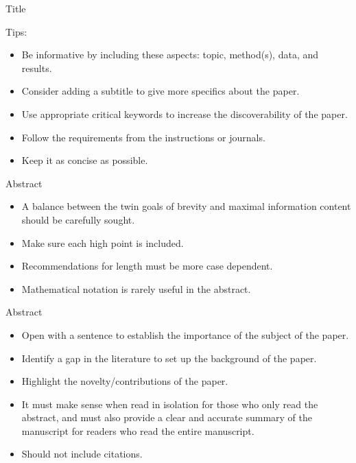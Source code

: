 \documentclass{beamer}
\begin{document}
    
    \begin{frame}{Title}
    
    Tips:
    \begin{itemize}
        \item Be informative by including these aspects: topic, method(s), data, and results.
        \item Consider adding a subtitle to give more specifics about the paper.
        \item Use appropriate critical keywords to increase the discoverability of the paper.
        \item Follow the requirements from the instructions or journals.
        \item Keep it as concise as possible.
    \end{itemize}
    
    \end{frame}
    
    
    \begin{frame}{Abstract}
    \begin{itemize}
        \item A balance between the twin goals of brevity and maximal information content should be carefully sought.
        \item Make sure each high point is included.
        \item Recommendations for length must be more case dependent.
        \item Mathematical notation is rarely useful in the abstract.
    \end{itemize}
    \end{frame}
    
    
    \begin{frame}{Abstract}
    \begin{itemize}
        \item Open with a sentence to establish the importance of the subject of the paper.
        \item Identify a gap in the literature to set up the background of the paper.
        \item Highlight the novelty/contributions of the paper.
        \item It must make sense when read in isolation for those who only read the abstract, and must also provide a clear and accurate summary of the manuscript for readers who read the entire manuscript.
        \item Should not include citations.
    \end{itemize}
    \end{frame}
    
\end{document}
